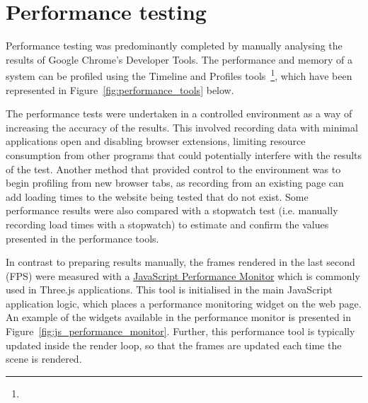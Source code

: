 \section{Performance testing} {
\label{sec:performance_testing}

	Performance testing was predominantly completed by manually analysing the results of Google Chrome's Developer Tools. The performance and memory of a system can be profiled using the Timeline and Profiles tools~\footnote{}, which have been represented in Figure~\ref{fig:performance_tools} below.

	

	The performance tests were undertaken in a controlled environment as a way of increasing the accuracy of the results. This involved recording data with minimal applications open and disabling browser extensions, limiting resource consumption from other programs that could potentially interfere with the results of the test. Another method that provided control to the environment was to begin profiling from new browser tabs, as recording from an existing page can add loading times to the website being tested that do not exist. Some performance results were also compared with a stopwatch test (i.e. manually recording load times with a stopwatch) to estimate and confirm the values presented in the performance tools.

	In contrast to preparing results manually, the frames rendered in the last second (FPS) were measured with a \href{https://github.com/mrdoob/stats.js/}{JavaScript Performance Monitor} which is commonly used in Three.js applications. This tool is initialised in the main JavaScript application logic, which places a performance monitoring widget on the web page. An example of the widgets available in the performance monitor is presented in Figure~\ref{fig:js_performance_monitor}. Further, this performance tool is typically updated inside the render loop, so that the frames are updated each time the scene is rendered.

	

}

